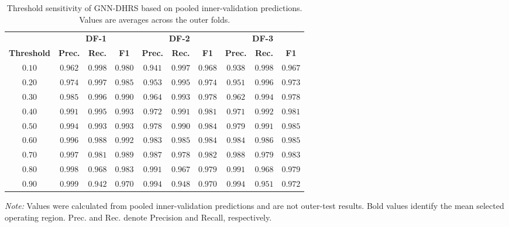\documentclass[pdflatex,sn-mathphys-num]{sn-jnl}%
\theoremstyle{thmstyleone}%
\theoremstyle{thmstyletwo}%
\theoremstyle{thmstylethree}%
\begin{document}
\begin{table}[!ht]
\centering
\caption{
Threshold sensitivity of GNN-DHRS based on pooled inner-validation
predictions. Values are averages across the outer folds.
}
\label{tab:threshold_sensitivity}
\scriptsize
\setlength{\tabcolsep}{3.2pt}
\renewcommand{\arraystretch}{1.08}
\begin{tabular}{@{}cccccccccc@{}}
\toprule
&
\multicolumn{3}{c}{\textbf{DF-1}} &
\multicolumn{3}{c}{\textbf{DF-2}} &
\multicolumn{3}{c}{\textbf{DF-3}} \\
\cmidrule(lr){2-4}
\cmidrule(lr){5-7}
\cmidrule(lr){8-10}
\textbf{Threshold} &
\textbf{Prec.} & \textbf{Rec.} & \textbf{F1} &
\textbf{Prec.} & \textbf{Rec.} & \textbf{F1} &
\textbf{Prec.} & \textbf{Rec.} & \textbf{F1} \\
\midrule
\(0.10\) &
\(0.962\) & \(0.998\) & \(0.980\) &
\(0.941\) & \(0.997\) & \(0.968\) &
\(0.938\) & \(0.998\) & \(0.967\) \\
\(0.20\) &
\(0.974\) & \(0.997\) & \(0.985\) &
\(0.953\) & \(0.995\) & \(0.974\) &
\(0.951\) & \(0.996\) & \(0.973\) \\
\(0.30\) &
\(0.985\) & \(0.996\) & \(0.990\) &
\(0.964\) & \(0.993\) & \(0.978\) &
\(0.962\) & \(0.994\) & \(0.978\) \\
\(0.40\) &
\(0.991\) & \(0.995\) & \(0.993\) &
\(0.972\) & \(0.991\) & \(0.981\) &
\(0.971\) & \(0.992\) & \(0.981\) \\
\(\mathbf{0.50}\) &
\(\mathbf{0.994}\) & \(\mathbf{0.993}\) & \(\mathbf{0.993}\) &
\(\mathbf{0.978}\) & \(\mathbf{0.990}\) & \(\mathbf{0.984}\) &
\(\mathbf{0.979}\) & \(\mathbf{0.991}\) & \(\mathbf{0.985}\) \\
\(0.60\) &
\(0.996\) & \(0.988\) & \(0.992\) &
\(0.983\) & \(0.985\) & \(0.984\) &
\(0.984\) & \(0.986\) & \(0.985\) \\
\(0.70\) &
\(0.997\) & \(0.981\) & \(0.989\) &
\(0.987\) & \(0.978\) & \(0.982\) &
\(0.988\) & \(0.979\) & \(0.983\) \\
\(0.80\) &
\(0.998\) & \(0.968\) & \(0.983\) &
\(0.991\) & \(0.967\) & \(0.979\) &
\(0.991\) & \(0.968\) & \(0.979\) \\
\(0.90\) &
\(0.999\) & \(0.942\) & \(0.970\) &
\(0.994\) & \(0.948\) & \(0.970\) &
\(0.994\) & \(0.951\) & \(0.972\) \\
\bottomrule
\end{tabular}

\vspace{2pt}
\begin{minipage}{0.98\textwidth}
\footnotesize
\textit{Note:} Values were calculated from pooled inner-validation
predictions and are not outer-test results. Bold values identify the mean
selected operating region. Prec. and Rec. denote Precision and Recall,
respectively.
\end{minipage}
\end{table}
\end{document}
